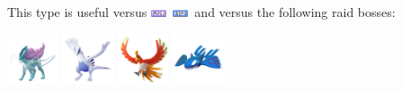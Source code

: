 \documentclass[12pt]{beamer}
\newcommand{\flyingfull}{\includegraphics[height=0.2cm]{../../images/type/full/Flying.png}}
\newcommand{\waterfull}{\includegraphics[height=0.2cm]{../../images/type/full/Water.png}}
\begin{document}
\begin{frame}
\begin{footnotesize}
\begin{block}{}\begin{center}
This type is useful versus \flyingfull~\waterfull~and versus the following raid bosses:

    \includegraphics[width=1.5cm]{../../images/pokemon/suicune}
    \includegraphics[width=1.5cm]{../../images/pokemon/lugia.png}
    \includegraphics[width=1.5cm]{../../images/pokemon/ho-oh}
    \includegraphics[width=1.5cm]{../../images/pokemon/kyogre}
\end{center}
\end{block}

\end{footnotesize}
\end{frame}



\end{document}
